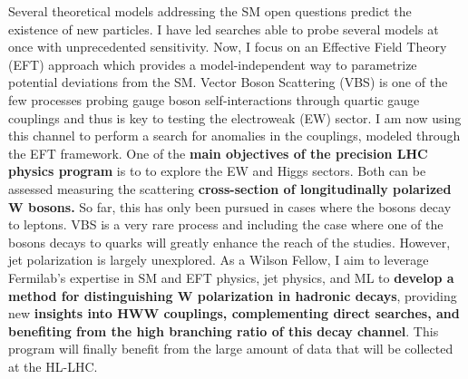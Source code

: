 {\begin{flushleft}
Several theoretical models addressing the SM open questions predict the existence of new particles. I have led searches able to probe several models at once with unprecedented sensitivity. Now, I focus on an Effective Field Theory (EFT) approach which provides a model-independent way to parametrize potential deviations from the SM. Vector Boson Scattering (VBS) is one of the few processes probing gauge boson self-interactions through quartic gauge couplings and thus is key to testing the electroweak (EW) sector. I am now using this channel to perform a search for anomalies in the couplings, modeled through the EFT framework. 
One of the {\bf main objectives of the precision LHC physics program} is to to explore the EW and Higgs sectors. Both can be assessed measuring the scattering {\bf cross-section of longitudinally polarized W bosons.} So far, this has only been pursued in cases where the bosons decay to leptons. VBS is a very rare process and including the case where one of the bosons decays to quarks will greatly enhance the reach of the studies. However, jet polarization is largely unexplored. As a Wilson Fellow, I aim to leverage Fermilab’s expertise in SM and EFT physics, jet physics, and ML to {\bf develop a method for distinguishing W polarization in hadronic decays}, providing new {\bf insights into HWW couplings, complementing direct searches, and benefiting from the high branching ratio of this decay channel}. This program will finally benefit from the large amount of data that will be collected at the HL-LHC. %


\end{flushleft}}
